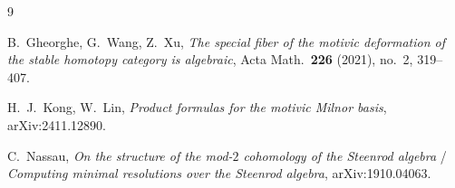 \documentclass[11pt]{article}
\theoremstyle{definition}
\begin{document}
\begin{thebibliography}{9}

B.~Gheorghe, G.~Wang, Z.~Xu,
\emph{The special fiber of the motivic deformation of the stable homotopy category
is algebraic}, Acta Math.\ \textbf{226} (2021), no.~2, 319--407.

H.~J.~Kong, W.~Lin,
\emph{Product formulas for the motivic Milnor basis},
arXiv:2411.12890.

C.~Nassau,
\emph{On the structure of the mod-$2$ cohomology of the Steenrod algebra} /
\emph{Computing minimal resolutions over the Steenrod algebra}, arXiv:1910.04063.

\end{thebibliography}
\end{document}
